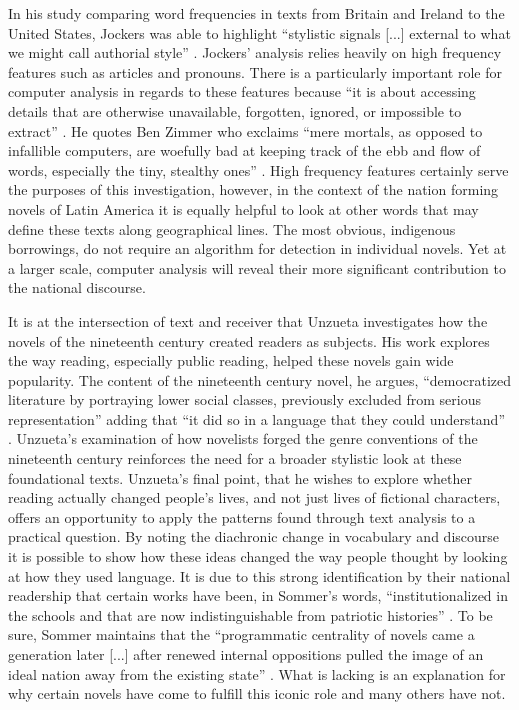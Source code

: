 \documentclass[12pt]{report}
\begin{document}
In his study comparing word frequencies in texts from Britain and Ireland to the United States, Jockers was able to highlight \enquote{stylistic signals [...] external to what we might call authorial style} \autocite*[2018]{Jockers2013}. Jockers' analysis relies heavily on high frequency features such as articles and pronouns. There is a particularly important role for computer analysis in regards to these features because \enquote{it is about accessing details that are otherwise unavailable, forgotten, ignored, or impossible to extract} \autocite[588]{Jockers2013}. He quotes Ben Zimmer who exclaims \enquote{mere mortals, as opposed to infallible computers, are woefully bad at keeping track of the ebb and flow of words, especially the tiny, stealthy ones} \autocite[589]{Jockers2013}. High frequency features certainly serve the purposes of this investigation, however, in the context of the nation forming novels of Latin America it is equally helpful to look at other words that may define these texts along geographical lines. The most obvious, indigenous borrowings, do not require an algorithm for detection in individual novels. Yet at a larger scale, computer analysis will reveal their more significant contribution to the national discourse.

It is at the intersection of text and receiver that Unzueta investigates how the novels of the nineteenth century created readers as subjects. His work explores the way reading, especially public reading, helped these novels gain wide popularity. The content of the nineteenth century novel, he argues, \enquote{democratized literature by portraying lower social classes, previously excluded from serious representation} adding that \enquote{it did so in a language that they could understand} \autocite*[81]{Unzueta2002}. 
Unzueta's examination of how novelists forged the genre conventions of the nineteenth century reinforces the need for a broader stylistic look at these foundational texts. Unzueta's final point, that he wishes to explore whether reading actually changed people's lives, and not just lives of fictional characters, offers an opportunity to apply the patterns found through text analysis to a practical question. 
By noting the diachronic change in vocabulary and discourse it is possible to show how these ideas changed the way people thought by looking at how they used language. It is due to this strong identification by their national readership that certain works have been, in Sommer's words, \enquote{institutionalized in the schools and that are now indistinguishable from patriotic histories} \autocite*[30]{Sommer1991}. 
To be sure, Sommer maintains that the \enquote{programmatic centrality of novels came a generation later [...] after renewed internal oppositions pulled the image of an ideal nation away from the existing state} \autocite*[30]{Sommer1991}. 
What is lacking is an explanation for why certain novels have come to fulfill this iconic role and many others have not. 
\end{document}
